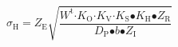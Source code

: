 \[{\sigma }_{\mathrm{H}}\mathrm{=}Z_{\mathrm{E}}\sqrt{\frac{W^{\mathrm{t}}{\mathrm{\cdot }K}_{\mathrm{O}}{\mathrm{\cdot }K}_{\mathrm{V}}\mathrm{\cdot }K_{\mathrm{S}}\mathrm{\bullet }K_{\mathrm{H}}\mathrm{\bullet }Z_{\mathrm{R}}}{D_{\mathrm{P}}\mathrm{\bullet }b\mathrm{\bullet }Z_{\mathrm{I}}}}\] 